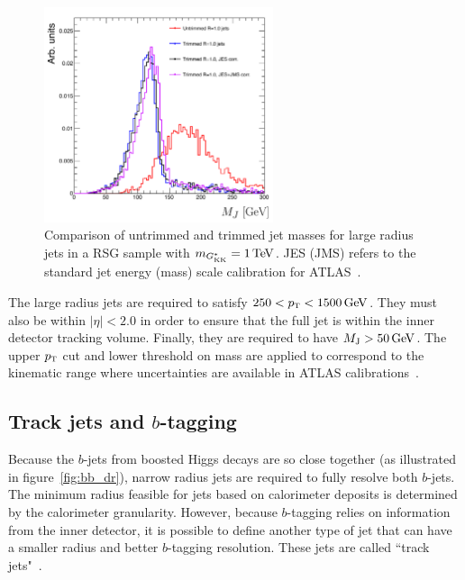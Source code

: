 \begin{figure}[h!]
  \centering
  \captionsetup{justification=centering}

  \includegraphics[width=0.6\textwidth]{figures/Trimmed_Mass}
  \caption{Comparison of untrimmed and trimmed jet masses for large radius jets in a RSG sample with $m_{\Gkk} = 1 \TeV$. JES (JMS) refers to the standard jet energy (mass) scale calibration for ATLAS~\cite{JetCalib}.}
  \label{fig:trimming}
\end{figure}

The large radius jets are required to satisfy $250 < \pt < 1500 \GeV$.  They must also be within $|\eta| < 2.0$ in order to ensure that the full jet is within the inner detector tracking volume. Finally, they are required to have $\MJ > 50 \GeV$. The upper $p_{\textrm{\footnotesize\sc t}}$ cut and lower threshold on mass are applied to correspond to the kinematic range where uncertainties are available in ATLAS calibrations~\cite{BoostedW,BoostedHiggs}.

\subsection{Track jets and $b$-tagging}

Because the $b$-jets from boosted Higgs decays are so close together (as illustrated in figure~\ref{fig:bb_dr}), narrow radius jets are required to fully resolve both $b$-jets. The minimum radius feasible for jets based on calorimeter deposits is determined by the calorimeter granularity. However, because $b$-tagging relies on information from the inner detector, it is possible to define another type of jet that can have a smaller radius and better $b$-tagging resolution. These jets are called ``track jets"~\cite{TrackJets,BoostedHiggs}.

